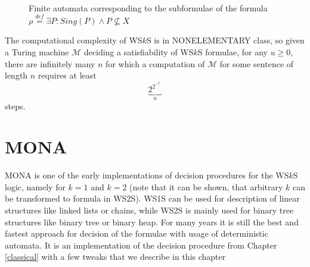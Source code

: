 \begin{figure}[h!]
\begin{center}
 \end{center}
 \caption{Finite automata corresponding to the subformulae of the formula
 $\rho \overset{\mathit{def}}{=} \exists P:
 Sing(P) \wedge P \not\subseteq X$}\label{automata}
\end{figure}
   \noindent\hrulefill

The computational complexity of WS$k$S is in NONELEMENTARY class, so given
a Turing machine $\mathcal{M}$ deciding a satisfiability of WS$k$S formulae, for
any $u \geq 0$, there are infinitely many $n$ for which a computation of
$\mathcal{M}$ for some sentence of length $n$ requires at least
$$\underbrace{2^{2^{\iddots^{2^n}}}}_u$$ steps.
	
\chapter{\textsc{MONA}}\label{monachap}

 \textsc{MONA} \cite{mona} is one of the early implementations of decision
 procedures for the WS$k$S logic, namely for $k = 1$ and $k = 2$ (note that it
 can be shown, that arbitrary $k$ can be transformed to formula in WS2S). WS1S
 can be used for description of linear structures like linked lists or chains,
 while WS2S is mainly used for binary tree structures like binary tree or binary
 heap. For many years it is still the best and fastest approach for decision of
 the formulae with usage of deterministic automata. It is an implementation of
 the decision procedure from Chapter \ref{classical} with a few tweaks that we
 describe in this chapter

